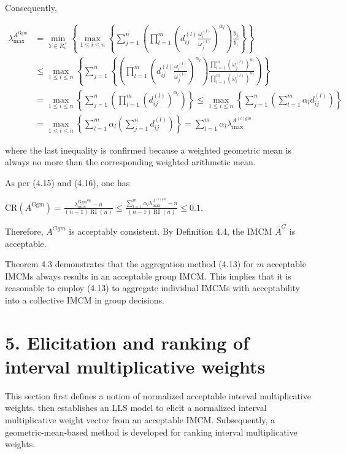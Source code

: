 \documentclass[10pt]{article}
\begin{document}
Consequently,

$$
\begin{aligned}
\lambda_{\max }^{A^{\mathrm{Ggm}}} & =\min _{Y \in R_{n}^{+}}\left\{\max _{1 \leq i \leq n}\left\{\sum_{j=1}^{n}\left(\prod_{l=1}^{m}\left(d_{i j}^{(l)} \frac{\omega_{i}^{(l)}}{\omega_{j}^{(l)}}\right)^{\alpha_{l}}\right) \frac{y_{j}}{y_{i}}\right\}\right\} \\
& \leq \max _{1 \leq i \leq n}\left\{\sum_{j=1}^{n}\left\{\left(\prod_{l=1}^{m}\left(d_{i j}^{(l)} \frac{\omega_{i}^{(l)}}{\omega_{j}^{(l)}}\right)^{\alpha_{l}}\right) \frac{\prod_{l=1}^{m}\left(\omega_{j}^{(l)}\right)^{\alpha_{l}}}{\prod_{l=1}^{m}\left(\omega_{i}^{(l)}\right)^{\alpha_{l}}}\right)\right\} \\
& =\max _{1 \leq i \leq n}\left\{\sum_{j=1}^{n}\left(\prod_{l=1}^{m}\left(d_{i j}^{(l)}\right)^{\alpha_{l}}\right)\right\} \leq \max _{1 \leq i \leq n}\left\{\sum_{j=1}^{n}\left(\sum_{l=1}^{m} \alpha_{l} d_{i j}^{(l)}\right)\right\} \\
& =\max _{1 \leq i \leq n}\left\{\sum_{l=1}^{m} \alpha_{l}\left(\sum_{j=1}^{n} d_{i j}^{(l)}\right)\right\}=\sum_{l=1}^{m} \alpha_{l} \lambda_{\max }^{A^{(l) g m}}
\end{aligned}
$$

where the last inequality is confirmed because a weighted geometric mean is always no more than the corresponding weighted arithmetic mean.

As per (4.15) and (4.16), one has

$\mathrm{CR}\left(A^{\mathrm{Ggm}}\right)=\frac{\lambda_{\max }^{\mathrm{Ggm}^{\mathrm{Gg}}}-n}{(n-1) \operatorname{RI}(n)} \leq \frac{\sum_{l=1}^{m} \alpha_{l} \lambda_{\max }^{A^{(l) g m}}-n}{(n-1) \operatorname{RI}(n)} \leq 0.1$.

Therefore, $A^{G g m}$ is acceptably consistent. By Definition 4.4, the IMCM $\bar{A}^{G}$ is acceptable.

Theorem 4.3 demonstrates that the aggregation method (4.13) for $m$ acceptable IMCMs always results in an acceptable group IMCM. This implies that it is reasonable to employ (4.13) to aggregate individual IMCMs with acceptability into a collective IMCM in group decisions.

\section*{5. Elicitation and ranking of interval multiplicative weights}
This section first defines a notion of normalized acceptable interval multiplicative weights, then establishes an LLS model to elicit a normalized interval multiplicative weight vector from an acceptable IMCM. Subsequently, a geometric-mean-based method is developed for ranking interval multiplicative weights.
\end{document}
